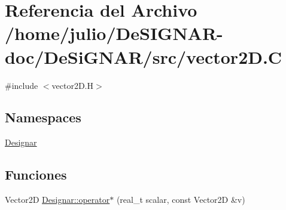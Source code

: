 \hypertarget{vector2_d_8_c}{}\section{Referencia del Archivo /home/julio/\+De\+S\+I\+G\+N\+A\+R-\/doc/\+De\+Si\+G\+N\+A\+R/src/vector2D.C}
\label{vector2_d_8_c}
{\ttfamily \#include $<$vector2\+D.\+H$>$}\newline
\subsection*{Namespaces}
\begin{DoxyCompactItemize}
\item 
 \hyperlink{namespace_designar}{Designar}
\end{DoxyCompactItemize}
\subsection*{Funciones}
\begin{DoxyCompactItemize}
\item 
Vector2D \hyperlink{namespace_designar_a4b2db2e125d6ac9edf439f63804ba674}{Designar\+::operator$\ast$} (real\+\_\+t scalar, const Vector2D \&v)
\end{DoxyCompactItemize}
